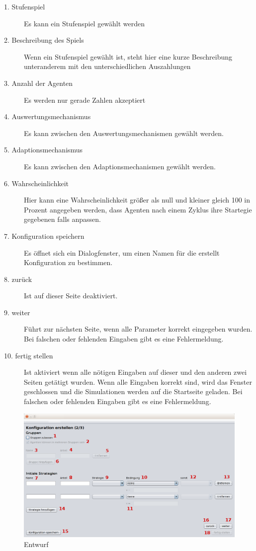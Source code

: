 \begin{description}

\item[1. Stufenspiel] Es kann ein Stufenspiel gewählt werden

\item[2. Beschreibung des Spiels] Wenn ein Stufenspiel gewählt ist, steht hier eine kurze Beschreibung unteranderem mit den unterschiedlichen Auszahlungen

\item[3. Anzahl der Agenten] Es werden nur gerade Zahlen akzeptiert

\item[4. Auswertungsmechanismus] Es kann zwischen den Auswertungsmechanismen gewählt werden.

\item[5. Adaptionsmechanismus] Es kann zwischen den Adaptionsmechanismen gewählt werden.

\item[6. Wahrscheinlichkeit] Hier kann eine Wahrscheinlichkeit größer als null und kleiner gleich 100 in Prozent angegeben werden, dass Agenten nach einem Zyklus ihre Startegie gegebenen falls anpassen.

\item[7. Konfiguration speichern] Es öffnet sich ein Dialogfenster, um einen Namen für die erstellt Konfiguration zu bestimmen.

\item[8. zurück] Ist auf dieser Seite deaktiviert.

\item[9. weiter] Führt zur nächsten Seite, wenn alle Parameter korrekt eingegeben wurden. Bei falschen oder fehlenden Eingaben gibt es eine Fehlermeldung.

\item[10. fertig stellen] Ist aktiviert wenn alle nötigen Eingaben auf dieser und den anderen zwei Seiten getätigt wurden. Wenn alle Eingaben korrekt sind, wird das Fenster geschlossen und die Simulationen werden auf die Startseite geladen. Bei falschen oder fehlenden Eingaben gibt es eine Fehlermeldung.

\end{description}

\begin{figure}[htbp] 
  \centering
     \includegraphics[width=1.2\textwidth]{GUI_Entwurf/WizardFenster2.png}
  \caption{Entwurf}
  \label{fig:Bild1}
\end{figure}

